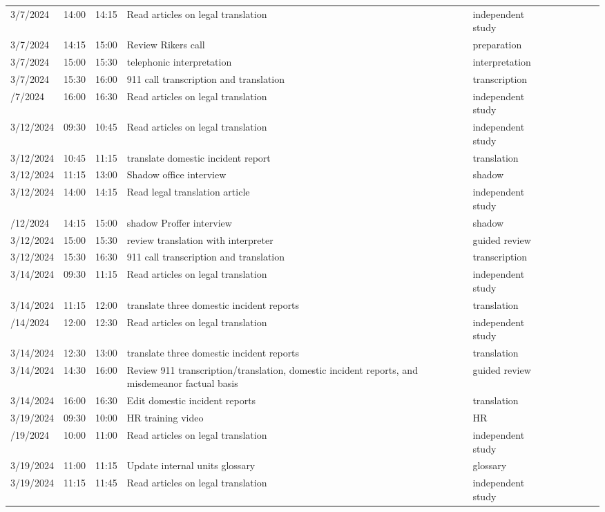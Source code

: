 \documentclass{article}
\begin{document}
\begin{longtable}{lp{1.8cm} l p{5cm} l p{1.5cm} l p{5cm} l p{5cm}}
3/7/2024 & 14:00 & 14:15 & Read articles on legal translation & independent study\\
3/7/2024 & 14:15 & 15:00 & Review Rikers call & preparation\\
3/7/2024 & 15:00 & 15:30 & telephonic interpretation & interpretation\\
3/7/2024 & 15:30 & 16:00 & 911 call transcription and translation & transcription\\
\addlinespace
3/7/2024 & 16:00 & 16:30 & Read articles on legal translation & independent study\\
3/12/2024 & 09:30 & 10:45 & Read articles on legal translation & independent study\\
3/12/2024 & 10:45 & 11:15 & translate domestic incident report & translation\\
3/12/2024 & 11:15 & 13:00 & Shadow office interview & shadow\\
3/12/2024 & 14:00 & 14:15 & Read legal translation article & independent study\\
\addlinespace
3/12/2024 & 14:15 & 15:00 & shadow Proffer interview & shadow\\
3/12/2024 & 15:00 & 15:30 & review translation with interpreter & guided review\\
3/12/2024 & 15:30 & 16:30 & 911 call transcription and translation & transcription\\
3/14/2024 & 09:30 & 11:15 & Read articles on legal translation & independent study\\
3/14/2024 & 11:15 & 12:00 & translate three domestic incident reports & translation\\
\addlinespace
3/14/2024 & 12:00 & 12:30 & Read articles on legal translation & independent study\\
3/14/2024 & 12:30 & 13:00 & translate three domestic incident reports & translation\\
3/14/2024 & 14:30 & 16:00 & Review 911 transcription/translation, domestic incident reports, and misdemeanor factual basis & guided review\\
3/14/2024 & 16:00 & 16:30 & Edit domestic incident reports & translation\\
3/19/2024 & 09:30 & 10:00 & HR training video & HR\\
\addlinespace
3/19/2024 & 10:00 & 11:00 & Read articles on legal translation & independent study\\
3/19/2024 & 11:00 & 11:15 & Update internal units glossary & glossary\\
3/19/2024 & 11:15 & 11:45 & Read articles on legal translation & independent study\\

\end{longtable}
\end{document}
